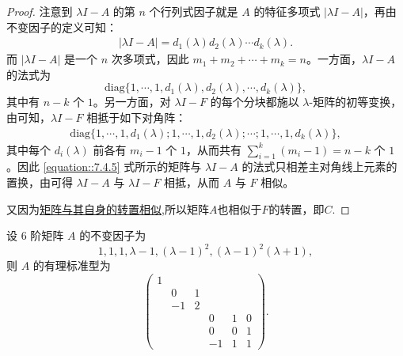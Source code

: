 \documentclass[../../main.tex]{subfiles}%
\begin{document}
\begin{proof}
注意到 $\lambda I - A$ 的第 $n$ 个行列式因子就是 $A$ 的特征多项式 $|\lambda I - A|$，再由不变因子的定义可知：
\begin{align*}
|\lambda I - A| = d_1(\lambda)d_2(\lambda)\cdots d_k(\lambda).
\end{align*}
而 $|\lambda I - A|$ 是一个 $n$ 次多项式，因此 $m_1 + m_2 + \cdots + m_k = n$。一方面，$\lambda I - A$ 的法式为
\[
\mathrm{diag}\{1,\cdots,1,d_1(\lambda),d_2(\lambda),\cdots,d_k(\lambda)\},
\]
其中有 $n - k$ 个 $1$。另一方面，对 $\lambda I - F$ 的每个分块都施以 $\lambda$-矩阵的初等变换，由可知，$\lambda I - F$ 相抵于如下对角阵：
\begin{align}
\mathrm{diag}\{1,\cdots,1,d_1(\lambda);1,\cdots,1,d_2(\lambda);\cdots;1,\cdots,1,d_k(\lambda)\},
\label{equation::7.4.5}
\end{align}
其中每个 $d_i(\lambda)$ 前各有 $m_i - 1$ 个 $1$，从而共有 $\sum_{i = 1}^{k}(m_i - 1)=n - k$ 个 $1$。因此 \eqref{equation::7.4.5} 式所示的矩阵与 $\lambda I - A$ 的法式只相差主对角线上元素的置换，由可得 $\lambda I - A$ 与 $\lambda I - F$ 相抵，从而 $A$ 与 $F$ 相似。

又因为\hyperref[proposition:lambda-矩阵一定与其转置相似]{矩阵与其自身的转置相似},所以矩阵$A$也相似于$F$的转置，即$C$.
\end{proof}

\begin{example}
设 6 阶矩阵 $A$ 的不变因子为
\[
1,1,1,\lambda - 1,(\lambda - 1)^2,(\lambda - 1)^2(\lambda + 1),
\]
则 $A$ 的有理标准型为
\[
\begin{pmatrix}
1 & & & & & \\
& 0 & 1 & & & \\
& -1 & 2 & & & \\
& & & 0 & 1 & 0 \\
& & & 0 & 0 & 1 \\
& & & -1 & 1 & 1
\end{pmatrix}.
\] 
\end{example}
\end{document}
